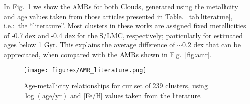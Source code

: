 \documentclass[draft]{aa}
\begin{document}
\begin{appendix}
In Fig.~\ref{fig:amr_lit} we show the AMRs for both Clouds, generated using the
metallicity and age values taken from those articles presented in
Table.~\ref{tab:literature}, i.e.:~the ``literature''.
Most clusters in these works are assigned fixed metallicities of -0.7 dex and
-0.4 dex for the S/LMC, respectively; particularly for estimated ages below 1
Gyr. This explains the average difference of ${\sim}0.2$ dex that can be
appreciated, when compared with the AMRs shown in Fig.~\ref{fig:amr}.

\begin{figure}
\centering
\texttt{[image: figures/AMR\_literature.png]}
\caption{Age-metallicity relationships for our set of 239 clusters, using
$\log\mathrm{(age/yr)}$ and [Fe/H] values taken from the literature.}
\label{fig:amr_lit}
\end{figure}

\end{appendix} 
\end{document}
